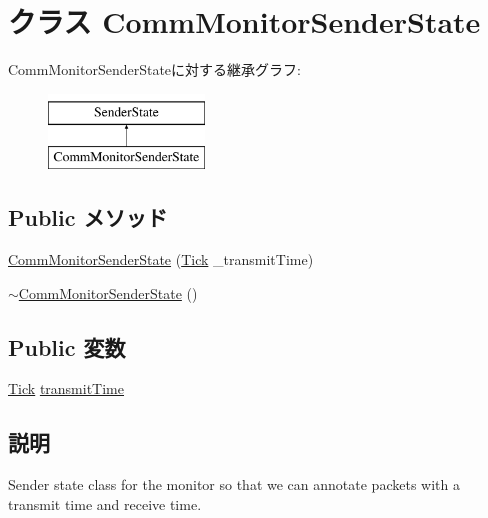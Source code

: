 \hypertarget{classCommMonitor_1_1CommMonitorSenderState}{
\section{クラス CommMonitorSenderState}
\label{classCommMonitor_1_1CommMonitorSenderState}
}
CommMonitorSenderStateに対する継承グラフ:\begin{figure}[H]
\begin{center}
\leavevmode
\includegraphics[height=2cm]{classCommMonitor_1_1CommMonitorSenderState}
\end{center}
\end{figure}
\subsection*{Public メソッド}
\begin{DoxyCompactItemize}
\item 
\hyperlink{classCommMonitor_1_1CommMonitorSenderState_ac479caf694f1ab2ffe5f06991fba167e}{CommMonitorSenderState} (\hyperlink{base_2types_8hh_a5c8ed81b7d238c9083e1037ba6d61643}{Tick} \_\-transmitTime)
\item 
\hyperlink{classCommMonitor_1_1CommMonitorSenderState_aa0073f8734a0fbce7bf5ec9fcd4c0ca4}{$\sim$CommMonitorSenderState} ()
\end{DoxyCompactItemize}
\subsection*{Public 変数}
\begin{DoxyCompactItemize}
\item 
\hyperlink{base_2types_8hh_a5c8ed81b7d238c9083e1037ba6d61643}{Tick} \hyperlink{classCommMonitor_1_1CommMonitorSenderState_ab7077cb90afe42deef3ee128e127d636}{transmitTime}
\end{DoxyCompactItemize}


\subsection{説明}
Sender state class for the monitor so that we can annotate packets with a transmit time and receive time. 

